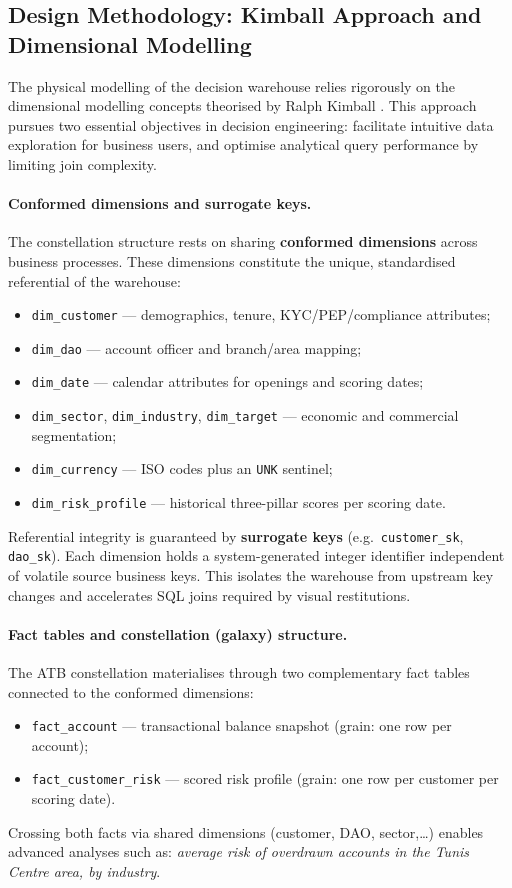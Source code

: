 \subsection{Design Methodology: Kimball Approach and Dimensional Modelling}
The physical modelling of the decision warehouse relies rigorously on the
dimensional modelling concepts theorised by Ralph Kimball \cite{kimball2013}.
This approach pursues two essential objectives in decision engineering:
facilitate intuitive data exploration for business users, and optimise analytical
query performance by limiting join complexity.

\paragraph{Conformed dimensions and surrogate keys.}
The constellation structure rests on sharing \textbf{conformed dimensions}
across business processes. These dimensions constitute the unique, standardised
referential of the warehouse:
\begin{itemize}
    \item \texttt{dim\_customer} --- demographics, tenure, KYC/PEP/compliance attributes;
    \item \texttt{dim\_dao} --- account officer and branch/area mapping;
    \item \texttt{dim\_date} --- calendar attributes for openings and scoring dates;
    \item \texttt{dim\_sector}, \texttt{dim\_industry}, \texttt{dim\_target} ---
          economic and commercial segmentation;
    \item \texttt{dim\_currency} --- ISO codes plus an \texttt{UNK} sentinel;
    \item \texttt{dim\_risk\_profile} --- historical three-pillar scores per scoring date.
\end{itemize}

Referential integrity is guaranteed by \textbf{surrogate keys} (e.g.\
\texttt{customer\_sk}, \texttt{dao\_sk}). Each dimension holds a system-generated
integer identifier independent of volatile source business keys. This isolates
the warehouse from upstream key changes and accelerates SQL joins required by
visual restitutions.

\paragraph{Fact tables and constellation (galaxy) structure.}
The ATB constellation materialises through two complementary fact tables connected
to the conformed dimensions:
\begin{itemize}
    \item \texttt{fact\_account} --- transactional balance snapshot (grain: one row
          per account);
    \item \texttt{fact\_customer\_risk} --- scored risk profile (grain: one row per
          customer per scoring date).
\end{itemize}
Crossing both facts via shared dimensions (customer, DAO, sector,\ldots) enables
advanced analyses such as: \emph{average risk of overdrawn accounts in the Tunis
Centre area, by industry}.

